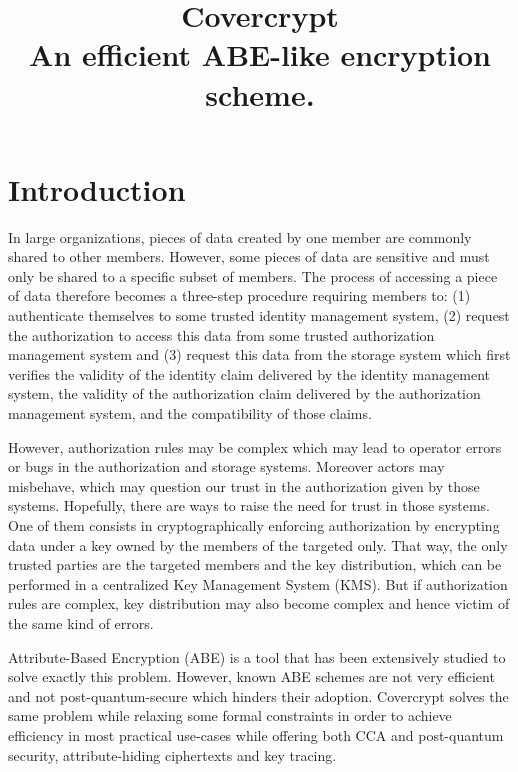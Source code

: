 \documentclass[a4paper]{article}
\date{}
\title{Covercrypt\\\medskip
\large An efficient ABE-like encryption scheme.}
\theoremstyle{definition}
\begin{document}
\maketitle
\tableofcontents

\newpage
\section{Introduction}
\label{sec:orgd5c3498}

In large organizations, pieces of data created by one member are commonly shared
to other members.  However,  some pieces of data are sensitive  and must only be
shared to a specific subset of members. The process of accessing a piece of data
therefore becomes a three-step procedure  requiring members to: (1) authenticate
themselves  to  some  trusted  identity   management  system,  (2)  request  the
authorization to  access this  data from  some trusted  authorization management
system and  (3) request this data  from the storage system  which first verifies
the validity of the identity claim  delivered by the identity management system,
the  validity  of  the  authorization   claim  delivered  by  the  authorization
management system, and the compatibility of those claims.

However, authorization rules may be complex which may lead to operator errors or
bugs in  the authorization and  storage systems. Moreover actors  may misbehave,
which   may  question   our  trust   in   the  authorization   given  by   those
systems. Hopefully, there are ways to raise the need for trust in those systems.
One of them consists in  cryptographically enforcing authorization by encrypting
data under a key owned by the members  of the targeted only.  That way, the only
trusted parties are the targeted members  and the key distribution, which can be
performed in  a centralized Key  Management System (KMS).  But  if authorization
rules are complex, key distribution may  also become complex and hence victim of
the same kind of errors.

Attribute-Based Encryption (ABE) is a tool  that has been extensively studied to
solve exactly this  problem.  However, known ABE schemes are  not very efficient
and not post-quantum-secure which hinders  their adoption. Covercrypt solves the
same  problem  while  relaxing  some  formal constraints  in  order  to  achieve
efficiency in most practical use-cases  while offering both CCA and post-quantum
security, attribute-hiding ciphertexts and key tracing.
\end{document}
